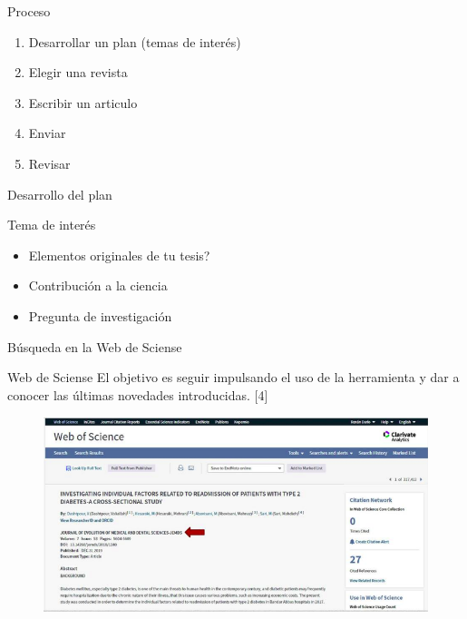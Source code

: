 \begin{frame}{Proceso}
\begin{block}{}
\begin{enumerate}
    \item Desarrollar un plan (temas de interés)
    \item Elegir una revista
    \item Escribir un articulo
    \item Enviar
    \item Revisar
\end{enumerate}
\end{block}   
\end{frame}

\begin{frame}{Desarrollo del plan}
\begin{block}{Tema de interés}
\begin{itemize}
    \item Elementos originales de tu tesis?
    \item Contribución a la ciencia
    \item Pregunta de investigación
\end{itemize}
\end{block}   
\end{frame}

\begin{frame}{Búsqueda en la Web de Sciense}
\begin{block}{Web de Sciense}
El objetivo es seguir impulsando el uso de la herramienta y dar a conocer las últimas novedades introducidas. [4]
\end{block}   
\begin{figure}[H]
    \includegraphics[scale=0.4]{images/webcite.png}
    \label{fig:boat1}
\end{figure}
\end{frame}

